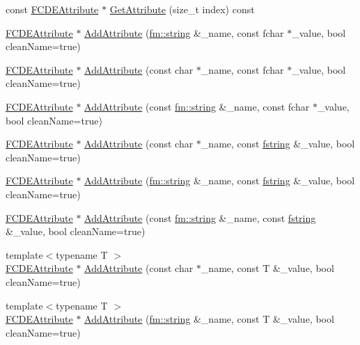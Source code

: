 \begin{DoxyCompactItemize}
\item 
const \hyperlink{classFCDEAttribute}{FCDEAttribute} $\ast$ \hyperlink{classFCDENode_a5ec77bab1c14fb21d72b407a6c6f59b6}{GetAttribute} (size\_\-t index) const 
\item 
\hyperlink{classFCDEAttribute}{FCDEAttribute} $\ast$ \hyperlink{classFCDENode_aeebafbb3f989c462f528b9dbbe1f8340}{AddAttribute} (\hyperlink{classfm_1_1stringT}{fm::string} \&\_\-name, const fchar $\ast$\_\-value, bool cleanName=true)
\item 
\hyperlink{classFCDEAttribute}{FCDEAttribute} $\ast$ \hyperlink{classFCDENode_a910a99b97e470ae580bb23fecc3de714}{AddAttribute} (const char $\ast$\_\-name, const fchar $\ast$\_\-value, bool cleanName=true)
\item 
\hyperlink{classFCDEAttribute}{FCDEAttribute} $\ast$ \hyperlink{classFCDENode_a64b7d06f6f1891805d179ee6f1add258}{AddAttribute} (const \hyperlink{classfm_1_1stringT}{fm::string} \&\_\-name, const fchar $\ast$\_\-value, bool cleanName=true)
\item 
\hyperlink{classFCDEAttribute}{FCDEAttribute} $\ast$ \hyperlink{classFCDENode_a1e11db3e9269d969858a9d40ac0d530e}{AddAttribute} (const char $\ast$\_\-name, const \hyperlink{classfm_1_1stringT}{fstring} \&\_\-value, bool cleanName=true)
\item 
\hyperlink{classFCDEAttribute}{FCDEAttribute} $\ast$ \hyperlink{classFCDENode_aa1ceea347c76e3db12aca3e92100493e}{AddAttribute} (\hyperlink{classfm_1_1stringT}{fm::string} \&\_\-name, const \hyperlink{classfm_1_1stringT}{fstring} \&\_\-value, bool cleanName=true)
\item 
\hyperlink{classFCDEAttribute}{FCDEAttribute} $\ast$ \hyperlink{classFCDENode_a7518f895be3b6a46d231020907de96c4}{AddAttribute} (const \hyperlink{classfm_1_1stringT}{fm::string} \&\_\-name, const \hyperlink{classfm_1_1stringT}{fstring} \&\_\-value, bool cleanName=true)
\item 
{\footnotesize template$<$typename T $>$ }\\\hyperlink{classFCDEAttribute}{FCDEAttribute} $\ast$ \hyperlink{classFCDENode_a3961036e3784499fce1eaa112686b551}{AddAttribute} (const char $\ast$\_\-name, const T \&\_\-value, bool cleanName=true)
\item 
{\footnotesize template$<$typename T $>$ }\\\hyperlink{classFCDEAttribute}{FCDEAttribute} $\ast$ \hyperlink{classFCDENode_a749f384bff85037c194ca0ac730be97e}{AddAttribute} (\hyperlink{classfm_1_1stringT}{fm::string} \&\_\-name, const T \&\_\-value, bool cleanName=true)

\end{DoxyCompactItemize}
